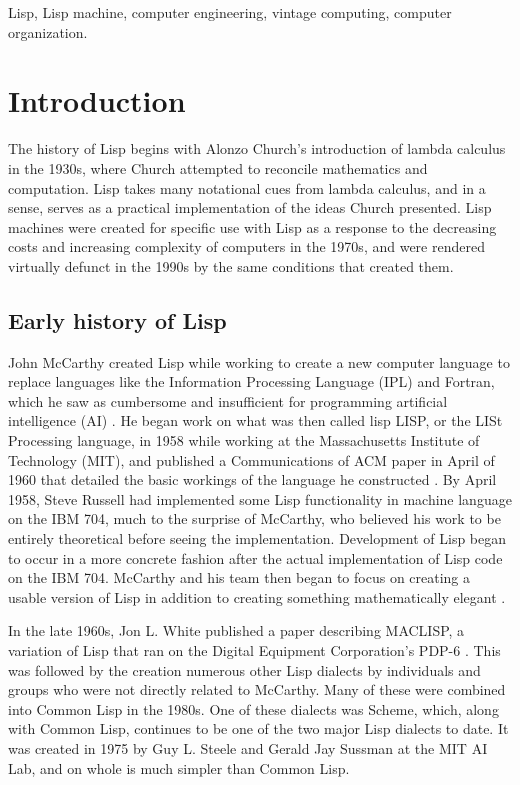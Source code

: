 \documentclass[journal]{IEEEtran}
\begin{document}
\begin{IEEEkeywords}
Lisp, Lisp machine, computer engineering, vintage computing, computer organization.
\end{IEEEkeywords}

\section{Introduction}
The history of Lisp begins with Alonzo Church's introduction of lambda calculus in the 1930s, where Church attempted to reconcile mathematics and computation. Lisp takes many notational cues from lambda calculus, and in a sense, serves as a practical implementation of the ideas Church presented. Lisp machines were created for specific use with Lisp as a response to the decreasing costs and increasing complexity of computers in the 1970s, and were rendered virtually defunct in the 1990s by the same conditions that created them. 

\subsection{Early history of Lisp}
John McCarthy created Lisp while working to create a new computer language to replace languages like the Information Processing Language (IPL) and Fortran, which he saw as cumbersome and insufficient for programming artificial intelligence (AI) \cite{stoyan}. He began work on what was then called lisp LISP, or the LISt Processing language, in 1958 while working at the Massachusetts Institute of Technology (MIT), and published a Communications of ACM paper in April of 1960 that detailed the basic workings of the language he constructed \cite{stoyan, mccarthy}. By April 1958, Steve Russell had implemented some Lisp functionality in machine language on the IBM 704, much to the surprise of McCarthy, who believed his work to be entirely theoretical before seeing the implementation. Development of Lisp began to occur in a more concrete fashion after the actual implementation of Lisp code on the IBM 704. McCarthy and his team then began to focus on creating a usable version of Lisp in addition to creating something mathematically elegant \cite{stoyan}.

In the late 1960s, Jon L. White published a paper describing MACLISP, a variation of Lisp that ran on the Digital Equipment Corporation's PDP-6 \cite{stoyan}. This was followed by the creation numerous other Lisp dialects by individuals and groups who were not directly related to McCarthy. Many of these were combined into Common Lisp in the 1980s. One of these dialects was Scheme, which, along with Common Lisp, continues to be one of the two major Lisp dialects to date. It was created in 1975 by  Guy L. Steele and Gerald Jay Sussman at the MIT AI Lab, and on whole is much simpler than Common Lisp.
\end{document}
